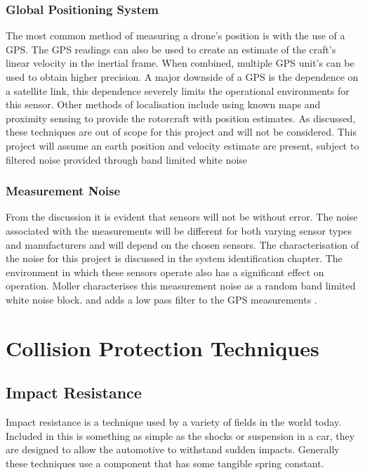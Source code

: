 		\subsubsection{Global Positioning System}
		The most common method of measuring a drone's position is with the use of a GPS. The GPS readings can also be used to create an estimate of the craft's linear velocity in the inertial frame. When combined, multiple GPS unit's can be used to obtain higher precision. A major downside of a GPS is the dependence on a satellite link, this dependence severely limits the operational environments for this sensor. Other methods of localisation include using known maps and proximity sensing to provide the rotorcraft with position estimates. As discussed, these techniques are out of scope for this project and will not be considered. This project will assume an earth position and velocity estimate are present, subject to filtered noise provided through band limited white noise \cite{Moller2015}
		
		\subsubsection{Measurement Noise}
		From the discussion it is evident that sensors will not be without error. The noise associated with the measurements will be different for both varying sensor types and manufacturers and will depend on the chosen sensors. The characterisation of the noise for this project is discussed in the system identification chapter. The environment in which these sensors operate also has a significant effect on operation. Moller characterises this measurement noise as a random band limited white noise block. and adds a low pass filter to the GPS measurements \cite{Moller2015}.

\section{Collision Protection Techniques}
	\cite{Klaptocz2013, Collision, Klaptocz2012, Briod2012, Daler2013, Klaptocz2010}
	\subsection{Impact Resistance}
	Impact resistance is a technique used by a variety of fields in the world today. Included in this is something as simple as the shocks or suspension in a car, they are designed to allow the automotive to withstand sudden impacts. Generally these techniques use a component that has some tangible spring constant.
	
